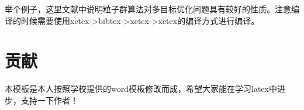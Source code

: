 \documentclass{suesreport}
\begin{document}
    举个例子，这里文献\citet{PSO_ZhangLibiao2004}中说明粒子群算法对多目标优化问题具有较好的性质。注意编译的时候需要使用xetex->bibtex->xetex->xetex的编译方式进行编译。
    \section{贡献}
    本模板是本人按照学校提供的word模板修改而成，希望大家能在学习latex中进步，支持一下作者！

    
    \nocite{*}
    
\end{document}
